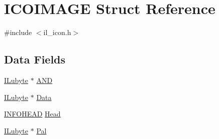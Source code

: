 \hypertarget{struct_i_c_o_i_m_a_g_e}{\section{I\-C\-O\-I\-M\-A\-G\-E Struct Reference}
\label{struct_i_c_o_i_m_a_g_e}
}


{\ttfamily \#include $<$il\-\_\-icon.\-h$>$}

\subsection*{Data Fields}
\begin{DoxyCompactItemize}
\item 
\hyperlink{il_8h_a8d2f04500100a86d1b00e98ab1b15a33}{I\-Lubyte} $\ast$ \hyperlink{struct_i_c_o_i_m_a_g_e_a0f578ed76f86adcb3c5fecd502f8636a}{A\-N\-D}
\item 
\hyperlink{il_8h_a8d2f04500100a86d1b00e98ab1b15a33}{I\-Lubyte} $\ast$ \hyperlink{struct_i_c_o_i_m_a_g_e_a32fd28ac5d89e3ef2f9151330af0149d}{Data}
\item 
\hyperlink{struct_i_n_f_o_h_e_a_d}{I\-N\-F\-O\-H\-E\-A\-D} \hyperlink{struct_i_c_o_i_m_a_g_e_ace5292f75d3e50590fb9ab9ca96616a8}{Head}
\item 
\hyperlink{il_8h_a8d2f04500100a86d1b00e98ab1b15a33}{I\-Lubyte} $\ast$ \hyperlink{struct_i_c_o_i_m_a_g_e_a561a236b698c68d57abbac93ddd37815}{Pal}
\end{DoxyCompactItemize}


